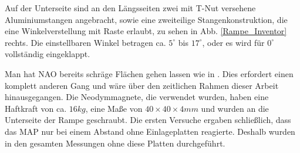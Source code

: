 Auf der Unterseite sind an den Längsseiten zwei mit T-Nut versehene Aluminiumstangen angebracht, sowie eine zweiteilige Stangenkonstruktion, die eine Winkelverstellung mit Raste erlaubt, zu sehen in Abb. \ref{Rampe_Inventor} rechts. Die einstellbaren Winkel betragen ca. $5^\circ$ bis $17^\circ$, oder es wird für $0^\circ$ vollständig eingeklappt.
  
Man hat NAO bereits schräge Flächen gehen lassen wie in \cite{Lutz_naowalking}. Dies erfordert einen komplett anderen Gang und wäre über den zeitlichen Rahmen dieser Arbeit hinausgegangen. Die Neodymmagnete, die verwendet wurden, haben eine Haftkraft von ca. $16 \unit{kg}$, eine Maße von $40\times40\times4 \unit{mm}$ \cite{schraubmagnet} und wurden an die Unterseite der Rampe geschraubt. Die ersten Versuche ergaben schließlich, dass das MAP nur bei einem Abstand ohne Einlageplatten reagierte. Deshalb wurden in den gesamten Messungen ohne diese Platten durchgeführt. 
